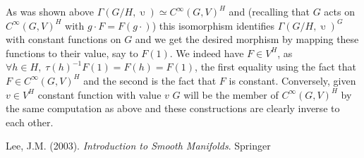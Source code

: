 \documentclass[8pt]{article} %
\begin{document}
	As was shown above $\Gamma(G/H,\upupsilon)\simeq C^\infty(G,V)^H$ and (recalling that $G$
	acts on $C^\infty(G,V)^H$ with $g\cdot F=F(g\cdot)$)
	this isomorphism identifies $\Gamma(G/H,\upupsilon)^G$ with constant functions on $G$
	and we get the desired morphism by mapping these functions to their value, say to $F(1)$. 
	We indeed have $F\in V^H$, as $\forall h\in H,\;\tau(h)^{ -1 }F(1)=F(h)=F(1)$, the first
	equality using the fact that $F\in C^\infty(G,V)^H$ and the second is the fact that $F$ is constant.
	Conversely, given $v\in V^H$ constant function with value $v$ $G$ will be the member of $C^\infty(G,V)^H$
	by the same computation as above and these constructions are clearly inverse to each other.
\begin{thebibliography}{9}
	Lee, J.M. (2003). {\it Introduction to Smooth Manifolds}. Springer
\end{thebibliography}
\end{document}
